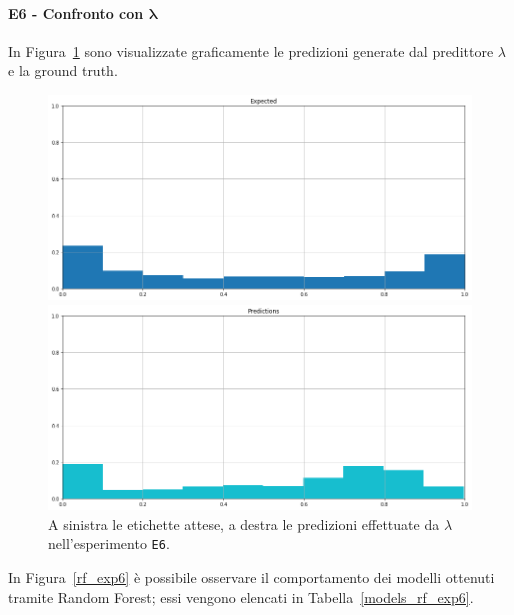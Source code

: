 \documentclass[12pt]{report}
\theoremstyle{definition}
\begin{document}
\paragraph{E6 - Confronto con $\bm{\lambda}$}
In Figura~\ref{prediction_exp6} sono visualizzate graficamente le predizioni generate dal predittore $\lambda$ e la ground truth.
\begin{figure}
\centering
    \begin{minipage}{0.48\textwidth}
        \includegraphics[width=\linewidth]{images/experiment_beta05_sovrapposti/expected_memberships.png}
    \end{minipage}
    \begin{minipage}{0.48\textwidth}
        \includegraphics[width=\linewidth]{images/experiment_beta05_sovrapposti/prediction_memberships.png}
    \end{minipage}
    \caption{A sinistra le etichette attese, a destra le predizioni effettuate da $\lambda$ nell'esperimento \texttt{E6}.}
    \label{prediction_exp6}
\end{figure} 

In Figura~\ref{rf_exp6} è possibile osservare il comportamento dei modelli ottenuti tramite Random Forest; essi vengono elencati in Tabella~\ref{models_rf_exp6}.
\end{document}
